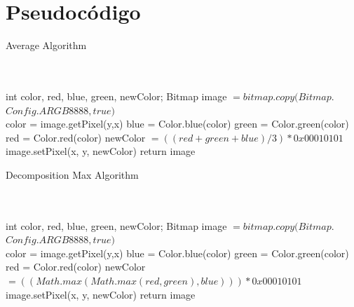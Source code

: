 \documentclass[conference]{IEEEtran}
\begin{document}
\section{Pseudoc\'odigo}
  \begin{algorithm}
   \caption{Average Algorithm}
    \begin{algorithmic}[1]
      \\
		\\
        \State int color, red, blue, green, newColor;
        \State  Bitmap image $= bitmap.copy(Bitmap.$
        \State $Config.ARGB8888, true)$
\\
            		\State color = image.getPixel(y,x)
            		\State blue = Color.blue(color)
            		\State green = Color.green(color)
            		\State red = Color.red(color)
            		\State newColor $= ((red+green+blue)/3)*0x00010101$
                \State image.setPixel(x, y, newColor)
        		\EndFor
        \EndFor
        \State return image
       \EndFunction

\end{algorithmic}
\end{algorithm}
\begin{algorithm}
   \caption{Decomposition Max Algorithm}
    \begin{algorithmic}[1]
      \\
		\\
        \State int color, red, blue, green, newColor;
        \State  Bitmap image $= bitmap.copy(Bitmap.$
        \State $Config.ARGB8888, true)$
\\
            		\State color = image.getPixel(y,x)
            		\State blue = Color.blue(color)
            		\State green = Color.green(color)
            		\State red = Color.red(color)
            		\State newColor $= ((Math.max(Math.max(red, green), blue)))*0x00010101$
                \State image.setPixel(x, y, newColor)
        		\EndFor
        \EndFor
        \State return image
       \EndFunction

\end{algorithmic}
\end{algorithm}
\end{document}
